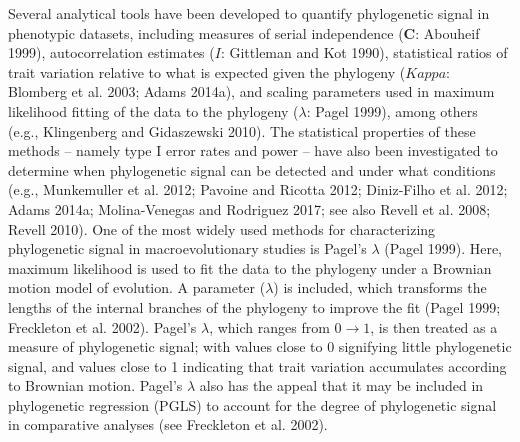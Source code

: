 \documentclass[
]{article}
\begin{document}
Several analytical tools have been developed to quantify phylogenetic
signal in phenotypic datasets, including measures of serial independence
(\(\mathbf{C}\): Abouheif 1999), autocorrelation estimates (\(I\):
Gittleman and Kot 1990), statistical ratios of trait variation relative
to what is expected given the phylogeny (\(Kappa\): Blomberg et al.
2003; Adams 2014a), and scaling parameters used in maximum likelihood
fitting of the data to the phylogeny (\(\lambda\): Pagel 1999), among
others (e.g., Klingenberg and Gidaszewski 2010). The statistical
properties of these methods -- namely type I error rates and power --
have also been investigated to determine when phylogenetic signal can be
detected and under what conditions (e.g., Munkemuller et al. 2012;
Pavoine and Ricotta 2012; Diniz-Filho et al. 2012; Adams 2014a;
Molina-Venegas and Rodriguez 2017; see also Revell et al. 2008; Revell
2010). One of the most widely used methods for characterizing
phylogenetic signal in macroevolutionary studies is Pagel's \(\lambda\)
(Pagel 1999). Here, maximum likelihood is used to fit the data to the
phylogeny under a Brownian motion model of evolution. A parameter
(\(\lambda\)) is included, which transforms the lengths of the internal
branches of the phylogeny to improve the fit (Pagel 1999; Freckleton et
al. 2002). Pagel's \(\lambda\), which ranges from \(0\to1\), is then
treated as a measure of phylogenetic signal; with values close to 0
signifying little phylogenetic signal, and values close to 1 indicating
that trait variation accumulates according to Brownian motion. Pagel's
\(\lambda\) also has the appeal that it may be included in phylogenetic
regression (PGLS) to account for the degree of phylogenetic signal in
comparative analyses (see Freckleton et al. 2002). \hfill\break
\end{document}
